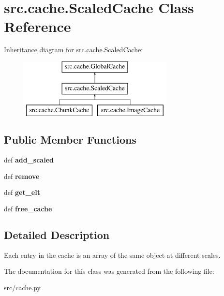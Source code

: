 \hypertarget{classsrc_1_1cache_1_1_scaled_cache}{\section{src.\-cache.\-Scaled\-Cache \-Class \-Reference}
\label{classsrc_1_1cache_1_1_scaled_cache}
}
\-Inheritance diagram for src.\-cache.\-Scaled\-Cache\-:\begin{figure}[H]
\begin{center}
\leavevmode
\includegraphics[height=3.000000cm]{classsrc_1_1cache_1_1_scaled_cache}
\end{center}
\end{figure}
\subsection*{\-Public \-Member \-Functions}
\begin{DoxyCompactItemize}
\item 
\hypertarget{classsrc_1_1cache_1_1_scaled_cache_ab5f3c86d112521b604d2550cffe91a12}{def {\bfseries add\-\_\-scaled}}\label{classsrc_1_1cache_1_1_scaled_cache_ab5f3c86d112521b604d2550cffe91a12}

\item 
\hypertarget{classsrc_1_1cache_1_1_scaled_cache_a93151f8e5cc63929e645090f7722cf75}{def {\bfseries remove}}\label{classsrc_1_1cache_1_1_scaled_cache_a93151f8e5cc63929e645090f7722cf75}

\item 
\hypertarget{classsrc_1_1cache_1_1_scaled_cache_aab73cd22bce9c3036221d2b3ae403aa6}{def {\bfseries get\-\_\-elt}}\label{classsrc_1_1cache_1_1_scaled_cache_aab73cd22bce9c3036221d2b3ae403aa6}

\item 
\hypertarget{classsrc_1_1cache_1_1_scaled_cache_a5a18613fcfe33f82cf1e592461100305}{def {\bfseries free\-\_\-cache}}\label{classsrc_1_1cache_1_1_scaled_cache_a5a18613fcfe33f82cf1e592461100305}

\end{DoxyCompactItemize}


\subsection{\-Detailed \-Description}
\begin{DoxyVerb}
Each entry in the cache is an array of the same object at
different scales.
\end{DoxyVerb}
 

\-The documentation for this class was generated from the following file\-:\begin{DoxyCompactItemize}
\item 
src/cache.\-py\end{DoxyCompactItemize}
